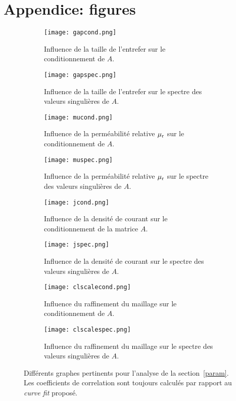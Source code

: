 \documentclass[11pt]{article}
\begin{document}
\section{Appendice: figures}
\begin{figure}[H]
	\centering
	\begin{subfigure}[t]{0.24\textwidth}
		\centering
		\texttt{[image: gapcond.png]}
		\caption{Influence de la taille de l'entrefer sur le  conditionnement de $A$.}
		\label{fig:gapcond}
	\end{subfigure}\hfill
	\begin{subfigure}[t]{0.24\textwidth}
		\centering
		\texttt{[image: gapspec.png]}
		\caption{Influence de la taille de l'entrefer sur le spectre des valeurs singulières de $A$.}
		\label{fig:gapspec}
	\end{subfigure}\hfill
	\begin{subfigure}[t]{0.24\textwidth}
		\centering
		\texttt{[image: mucond.png]}
		\caption{Influence de la perméabilité relative $\mu_{\textnormal{r}}$ sur le conditionnement de $A$.}
		\label{fig:mucond}
	\end{subfigure}\hfill
	\begin{subfigure}[t]{0.24\textwidth}
		\centering
		\texttt{[image: muspec.png]}
		\caption{Influence de la perméabilité relative $\mu_{\textnormal{r}}$ sur le spectre des valeurs singulières de $A$.}
		\label{fig:muspec}
	\end{subfigure}
	\begin{subfigure}[t]{0.24\textwidth}
		\centering
		\texttt{[image: jcond.png]}
		\caption{Influence de la densité de courant sur le conditionnement de la matrice $A$.}
		\label{fig:jcond}
	\end{subfigure}\hfill
	\begin{subfigure}[t]{0.24\textwidth}
		\centering
		\texttt{[image: jspec.png]}
		\caption{Influence de la densité de courant sur le spectre des valeurs singulières de $A$.}
		\label{fig:jspec}
	\end{subfigure}\hfill
	\begin{subfigure}[t]{0.24\textwidth}
		\centering
		\texttt{[image: clscalecond.png]}
		\caption{Influence du raffinement du maillage sur le conditionnement de $A$.}
		\label{fig:clscalecond}
	\end{subfigure}\hfill
	\begin{subfigure}[t]{0.24\textwidth}
		\centering
		\texttt{[image: clscalespec.png]}
		\caption{Influence du raffinement du maillage sur le spectre des valeurs singulières de $A$.}
		\label{fig:clscalespec}
	\end{subfigure}
	\caption{Différents graphes pertinents pour l'analyse de la section~\ref{param}.
	Les coefficients de correlation sont toujours calculés par rapport au \emph{curve fit} proposé.}
	\label{fig:figsec1}
\end{figure}
\end{document}

